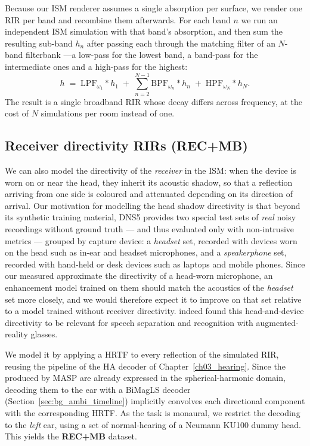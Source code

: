 \vspace{1cm}

Because our \acrshort{ISM} renderer assumes a single absorption per surface, we render
one \acrshort{RIR} per band and recombine them afterwards. For each band $n$ we run an independent
\acrshort{ISM} simulation with that band's absorption, and then sum the
resulting sub-band  $h_n$ after passing each through the
matching filter of an $N$-band filterbank ---a low-pass for the lowest band, a
band-pass for the intermediate ones and a high-pass for the highest:
\begin{equation}
    h \;=\; \mathrm{LPF}_{\omega_1} * h_1
      \;+\; \sum_{n=2}^{N-1} \mathrm{BPF}_{\omega_n} * h_n
      \;+\; \mathrm{HPF}_{\omega_N} * h_N .
    \label{eq:mbrirs_filterbank}
\end{equation}
The result is a single broadband \acrshort{RIR} whose decay differs across
frequency, at the cost of $N$ simulations per room instead of one.

\subsection{Receiver directivity RIRs (REC+MB)}
\label{ssec:mbrirs_rec}

We can also model the directivity of the \emph{receiver} in the
\acrshort{ISM}: when the device is worn on or
near the head, they inherit its acoustic shadow, so that a reflection arriving
from one side is coloured and attenuated depending on its direction of arrival. Our motivation for modelling the head shadow directivity is that beyond its
synthetic training material, \acrshort{DNS}5 provides two special test sets of
\emph{real} noisy recordings without ground truth --- and thus evaluated only
with non-intrusive metrics --- grouped by capture device: a \emph{headset} set,
recorded with devices worn on the head such as in-ear and headset microphones,
and a \emph{speakerphone} set, recorded with hand-held or desk devices such as
laptops and mobile phones. Since our measured  approximate the
directivity of a head-worn microphone, an enhancement model trained on them should match the
acoustics of the \emph{headset} set more closely, and we would therefore expect
it to improve on that set relative to a model trained without receiver
directivity. \citet{arakawa2024quantifying} indeed found this head-and-device
directivity to be relevant for speech separation and recognition with
augmented-reality glasses.

We model it by applying a \acrshort{HRTF} to every reflection of the simulated
\acrshort{RIR}, reusing the pipeline of the \acrshort{HA} decoder of
Chapter~\ref{ch03_hearing}. Since the  produced by
\acrshort{MASP} are already expressed in the spherical-harmonic domain,
decoding them to the ear with a \acrfull{BiMagLS} decoder
\citep{engel2021improving} (Section~\ref{sec:bg_ambi_timeline}) implicitly
convolves each directional component with the corresponding \acrshort{HRTF}.
As the task is monaural, we restrict the decoding to the \emph{left} ear, using
a set of normal-hearing  of a Neumann \acrshort{KU100} dummy
head. This yields the \textbf{REC+MB}
dataset.

